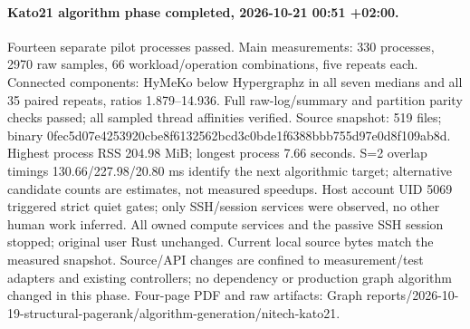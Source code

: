 \documentclass[11pt,a4paper]{article}
\begin{document}
\paragraph{Kato21 algorithm phase completed, 2026-10-21 00:51 +02:00.}
Fourteen separate pilot processes passed. Main measurements: 330 processes,
2970 raw samples, 66 workload/operation combinations, five repeats each.
Connected components: HyMeKo below Hypergraphz in all seven medians and all
35 paired repeats, ratios 1.879--14.936. Full raw-log/summary and partition parity
checks passed; all sampled thread affinities verified. Source snapshot: 519 files;
binary 0fec5d07e4253920cbe8f6132562bcd3c0bde1f6388bbb755d97e0d8f109ab8d.
Highest process RSS 204.98 MiB; longest process 7.66 seconds. S=2 overlap timings
130.66/227.98/20.80 ms identify the next algorithmic target; alternative candidate
counts are estimates, not measured speedups. Host account UID 5069 triggered strict
quiet gates; only SSH/session services were observed, no other human work inferred.
All owned compute services and the passive SSH session stopped; original user Rust
unchanged. Current local source bytes match the measured snapshot. Source/API changes
are confined to measurement/test adapters and existing controllers; no dependency or
production graph algorithm changed in this phase. Four-page PDF and raw artifacts:
Graph reports/2026-10-19-structural-pagerank/algorithm-generation/nitech-kato21.
\end{document}
